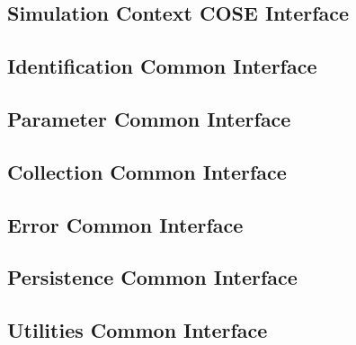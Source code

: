 \subsection{Simulation Context COSE Interface}


\subsection{Identification Common Interface}
\subsection{Parameter Common Interface}
\subsection{Collection Common Interface}
\subsection{Error Common Interface}
\subsection{Persistence Common Interface}
\subsection{Utilities Common Interface}


